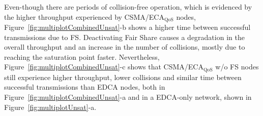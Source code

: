 

Even-though there are periods of collision-free operation, which is evidenced by the higher throughput experienced by CSMA/ECA$_{\text{QoS}}$ nodes, Figure~\ref{fig:multiplotCombinedUnsat}-b shows a higher time between successful transmissions due to FS. Deactivating Fair Share causes a degradation in the overall throughput and an increase in the number of collisions, mostly due to reaching the saturation point faster. Nevertheless, Figure~\ref{fig:multiplotCombinedUnsat}-c shows that CSMA/ECA$_{\text{QoS}}$ w/o FS nodes still experience higher throughput, lower collisions and similar time between successful transmissions than EDCA nodes, both in Figure~\ref{fig:multiplotCombinedUnsat}-a and in a EDCA-only network, shown in Figure~\ref{fig:multiplotUnsat}-a.


